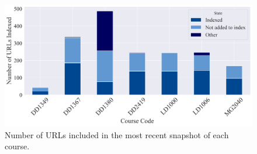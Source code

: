 \begin{figure}[H]
    \centering
    \includegraphics[width=1\textwidth]{results/plots/assets/performance-02-urls-per-course.png}
    \caption{Number of URLs included in the most recent snapshot of each course.}
    \label{fig:performance_02_urls_per_course}
\end{figure}